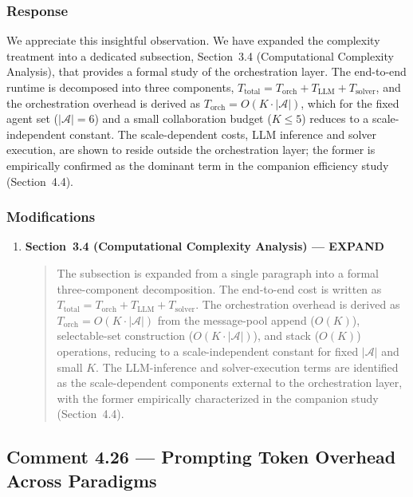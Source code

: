 \documentclass[11pt,a4paper]{article}
\begin{document}
\subsubsection{Response}
We appreciate this insightful observation. We have expanded the complexity treatment into a dedicated subsection, Section~3.4 (Computational Complexity Analysis), that provides a formal study of the orchestration layer. The end-to-end runtime is decomposed into three components, $T_{\text{total}}=T_{\text{orch}}+T_{\text{LLM}}+T_{\text{solver}}$, and the orchestration overhead is derived as $T_{\text{orch}}=O(K\cdot|\mathcal{A}|)$, which for the fixed agent set ($|\mathcal{A}|=6$) and a small collaboration budget ($K\le 5$) reduces to a scale-independent constant. The scale-dependent costs, LLM inference and solver execution, are shown to reside outside the orchestration layer; the former is empirically confirmed as the dominant term in the companion efficiency study (Section~4.4).

\subsubsection{Modifications}
\begin{enumerate}
\item \textbf{Section~3.4 (Computational Complexity Analysis) --- EXPAND}
\begin{quote}
The subsection is expanded from a single paragraph into a formal three-component decomposition. The end-to-end cost is written as $T_{\text{total}}=T_{\text{orch}}+T_{\text{LLM}}+T_{\text{solver}}$. The orchestration overhead is derived as $T_{\text{orch}}=O(K\cdot|\mathcal{A}|)$ from the message-pool append ($O(K)$), selectable-set construction ($O(K\cdot|\mathcal{A}|)$), and stack ($O(K)$) operations, reducing to a scale-independent constant for fixed $|\mathcal{A}|$ and small $K$. The LLM-inference and solver-execution terms are identified as the scale-dependent components external to the orchestration layer, with the former empirically characterized in the companion study (Section~4.4).
\end{quote}
\end{enumerate}

\subsection{Comment 4.26 --- Prompting Token Overhead Across Paradigms}
\end{document}

